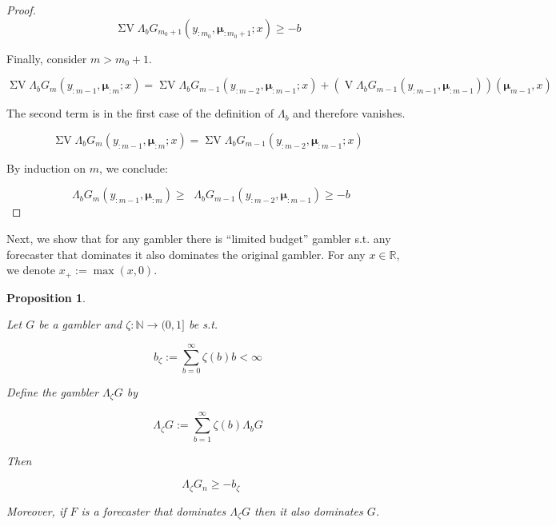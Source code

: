 \documentclass[11pt]{article}
\theoremstyle{definition}
\theoremstyle{plain}
\newtheorem{proposition}{Proposition}%
\newcommand{\Nats}{\mathbb{N}}
\newcommand{\Reals}{\mathbb{R}}
\DeclareMathOperator{\V}{V}
\DeclareMathOperator{\SV}{\Sigma V}
\DeclareMathOperator{\SVM}{\Sigma V_{\min}}
\newcommand{\Bd}{\Lambda}
\newcommand{\BM}{\bm{\mu}}
\begin{document}
\begin{proof}
$$\SV \Bd_b G_{m_0+1}\left(y_{:m_0},\BM_{:m_0+1};x\right) \geq -b$$

Finally, consider ${m > m_0 + 1}$.

$$\SV \Bd_b G_{m}\left(y_{:m-1},\BM_{:m};x\right) = \SV \Bd_b G_{m-1}\left(y_{:m-2},\BM_{:m-1};x\right) + \left(\V \Bd_b G_{m-1}\left(y_{:m-1},\BM_{:m-1}\right)\right)\left(\BM_{m-1},x\right)$$

The second term is in the first case of the definition of $\Bd_b$ and therefore vanishes.

$$\SV \Bd_b G_{m}\left(y_{:m-1},\BM_{:m};x\right) = \SV \Bd_b G_{m-1}\left(y_{:m-2},\BM_{:m-1};x\right)$$

By induction on ${m}$, we conclude:

$$\SVM \Bd_b G_{m}\left(y_{:m-1},\BM_{:m}\right) \geq \SVM \Bd_b G_{m-1}\left(y_{:m-2},\BM_{:m-1}\right) \geq -b$$
\end{proof}

Next, we show that for any gambler there is \enquote{limited budget} gambler s.t. any forecaster that dominates it also dominates the original gambler. For any $x \in \Reals$, we denote $x_+:=\max(x,0)$.

\begin{proposition}
\label{prp:frugal_gambler}

Let $G$ be a gambler and $\zeta: \Nats \rightarrow (0,1]$ be s.t.

\begin{equation}
b_\zeta := \sum_{b=0}^\infty \zeta\left(b\right) b < \infty
\end{equation}

Define the gambler $\Bd_\zeta G$ by

\begin{equation}
\Bd_\zeta G := \sum_{b = 1}^\infty \zeta\left(b\right) \Bd_b G
\end{equation}

Then

\begin{equation}
\label{eqn:prp_furgal_gambler__svm_b_zeta}
\SVM \Bd_\zeta G_n \geq -b_\zeta
\end{equation}

Moreover, if $F$ is a forecaster that dominates $\Bd_\zeta G$ then it also dominates $G$.

\end{proposition}
\end{document}
